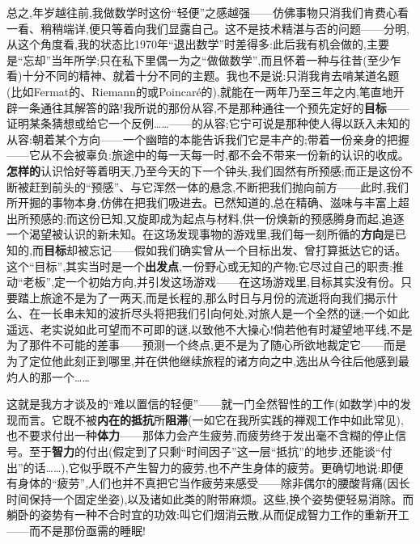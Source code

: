 总之,年岁越往前,我做数学时这份“轻便”之感越强——仿佛事物只消我们肯费心看一看、稍稍端详,便只等着向我们显露自己。这不是技术精湛与否的问题——分明,从这个角度看,我的状态比1970年“退出数学”时差得多:此后我有机会做的,主要是“忘却”当年所学;只在私下里偶一为之“做做数学”,而且怀着一种与往昔(至少乍看)十分不同的精神、就着十分不同的主题。我也不是说:只消我肯去啃某道名题(比如Fermat的、Riemann的或Poincaré的),就能在一两年\dmark{}乃至三年之内,笔直地开辟一条通往其解答的路!我所说的那份从容,不是那种通往一个预先定好的\textbf{目标}——证明某条猜想或给它一个反例……——的从容;它宁可说是那种使人得以跃入未知的从容:朝着某个方向——一个幽暗的本能告诉我们它是丰产的;带着一份亲身的把握——它从不会被辜负:旅途中的每一天每一时,都不会不带来一份新的认识的收成。\textbf{怎样的}认识恰好等着明天,乃至今天的下一个钟头,我们固然有所预感;而正是这份不断被赶到前头的“预感”、与它浑然一体的悬念,不断把我们抛向前方——此时,我们所开掘的事物本身,仿佛在把我们吸进去。已然知道的,总在精确、滋味与丰富上超出所预感的;而这份已知,又旋即成为起点与材料,供一份焕新的预感腾身而起,追逐一个渴望被认识的新未知。在这场发现事物的游戏里,我们每一刻所循的\textbf{方向}是已知的,而\textbf{目标}却被忘记——假如我们确实曾从一个目标出发、曾打算抵达它的话。这个“目标”,其实当时是一个\textbf{出发点},一份野心或无知的产物;它尽过自己的职责:推动“老板”,定一个初始方向,并引发这场游戏——在这场游戏里,目标其实没有份。只要踏上旅途不是为了一两天,而是长程的,那么时日与月份的流逝将向我们揭示什么、在一长串未知的波折尽头将把我们引向何处,对旅人是一个全然的谜;一个如此遥远、老实说如此可望而不可即的谜,以致他不大操心!倘若他有时凝望地平线,不是为了那件不可能的差事——预测一个终点,更不是为了随心所欲地裁定它——而是为了定位他此刻正到哪里,并在供他继续旅程的诸方向之中,选出从今往后他感到最灼人的那一个……

这就是我方才谈及的“难以置信的轻便”——就一门全然智性的工作(如数学)中的发现而言。它既不被\textbf{内在的抵抗}所\textbf{阻滞}(一如它在我所实践的禅观工作中如此常见),也不要求付出一种\textbf{体力}——那体力会产生疲劳,而疲劳终于发出毫不含糊的停止信号\dmark{}。至于\textbf{智力}的付出(假定到了只剩“时间因子”这一层“抵抗”的地步,还能谈“付出”的话……),它似乎既不产生智力的疲劳,也不产生身体的疲劳。更确切地说:即便有身体的“疲劳”,人们也并不真把它当作疲劳来感受——除非偶尔的腰酸背痛(因长时间保持一个固定坐姿),以及诸如此类的附带麻烦。这些,换个姿势便轻易消除。而躺卧的姿势有一种不合时宜的功效:叫它们烟消云散,从而促成智力工作的重新开工——而不是那份亟需的睡眠!

